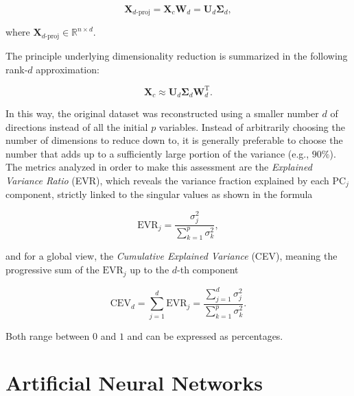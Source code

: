 \begin{equation}
    \mathbf{X}_{d\text{-proj}} =
    \mathbf{X}_c \mathbf{W}_d =
    \mathbf{U}_d\boldsymbol{\Sigma}_d,
    \label{eq:pca_scores_svd}
\end{equation}

where \(\mathbf{X}_{d\text{-proj}} \in \mathbb{R}^{n \times d}\). 

The principle underlying dimensionality reduction is summarized in the following rank-\(d\) approximation:

\begin{equation}
    \mathbf{X}_c \approx
    \mathbf{U}_d\boldsymbol{\Sigma}_d\mathbf{W}_d^{\mathrm{T}}.
    \label{eq:pca_low_rank}
\end{equation}

In this way, the original dataset was reconstructed using a smaller number \(d\) of directions instead of all the initial \(p\) variables. 
Instead of arbitrarily choosing the number of dimensions to reduce down to, it is
generally preferable to choose the number that adds up to a sufficiently
large portion of the variance (e.g., \(90\%\)).
The metrics analyzed in order to make this assessment are the \textit{Explained Variance Ratio} (EVR), which reveals the variance fraction explained by each \(\mathrm{PC}_j\) component, strictly linked to the singular values as shown in the formula

\begin{equation}
    \mathrm{EVR}_j =
    \frac{\sigma_j^2}{\sum_{k=1}^{p}\sigma_k^2}
    \label{eq:pca_explained_variance_ratio_svd},
\end{equation}

and for a global view, the \textit{Cumulative Explained Variance} (CEV), meaning the progressive sum of the \(\mathrm{EVR}_j\) up to the \(d\)-th component

\begin{equation}
    \mathrm{CEV}_d =
    \sum_{j=1}^{d}\mathrm{EVR}_j =
    \frac{\sum_{j=1}^{d}\sigma_j^2}{\sum_{k=1}^{p}\sigma_k^2}.
    \label{eq:pca_cumulative_explained_variance_svd}
\end{equation}

Both range between \(0\) and \(1\) and can be expressed as percentages. 




\section{Artificial Neural Networks}
\label{sec:ann_fundamentals}

